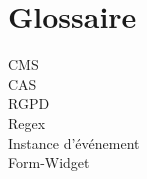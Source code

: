 \chapter{Glossaire}

\label{chap:glossary}

\begin{description}
    \item[CMS]
    \item[CAS]
    \item[RGPD]
    \item[Regex]
    \item[Instance d'événement]
    \item[Form-Widget]
\end{description}
